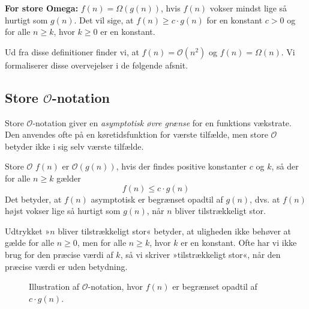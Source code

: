 \textbf{For store Omega:} \( f(n) = \Omega(g(n)) \), hvis \( f(n) \) vokser mindst lige så hurtigt som \( g(n) \). Det vil sige, at \( f(n) \geq c \cdot g(n) \) for en konstant \( c > 0 \) og for alle \( n \geq k \), hvor \( k \geq 0 \) er en konstant.

Ud fra disse definitioner finder vi, at \( f(n) = \mathcal{O}(n^2) \) og \( f(n) = \Omega(n) \). Vi formaliserer disse overvejelser i de følgende afsnit.

\subsection*{Store \texorpdfstring{$\mathcal{O}$}{O}-notation}
Store $\mathcal{O}$-notation giver en \textit{asymptotisk øvre grænse} for en funktions vækstrate. Den anvendes ofte på en køretidsfunktion for værste tilfælde, men store $\mathcal{O}$ betyder ikke i sig selv værste tilfælde.

\begin{definition}{Store $\mathcal{O}$}
    $f(n)$ er $\mathcal{O}(g(n))$, hvis der findes positive konstanter $c$ og $k$, så der for alle $n \geq k$ gælder
    \medskip
    \[
    f(n) \leq c \cdot g(n)
    \]
    \medskip
    Det betyder, at $f(n)$ asymptotisk er begrænset opadtil af $g(n)$, dvs. at $f(n)$ højst vokser lige så hurtigt som $g(n)$, når $n$ bliver tilstrækkeligt stor.
    \label{def:big_o_notation}
\end{definition}

Udtrykket »$n$ bliver tilstrækkeligt stor« betyder, at uligheden ikke behøver at gælde for alle $n \geq 0$, men for alle $n \geq k$, hvor $k$ er en konstant. Ofte har vi ikke brug for den præcise værdi af $k$, så vi skriver »tilstrækkeligt stor«, når den præcise værdi er uden betydning.

\begin{figure}[htbp]
    \centering
    \caption{Illustration af \(\mathcal{O}\)-notation, hvor $f(n)$ er begrænset opadtil af $c \cdot g(n)$.}
    \label{fig:big_o_notation}
\end{figure}

